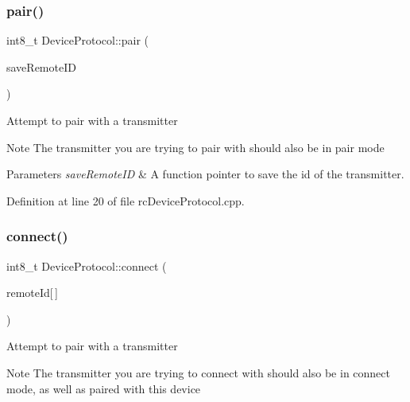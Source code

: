 \mbox{\label{classDeviceProtocol_aed6d598d72c46cfbc99cb9f8bcb301f7}} 
\subsubsection{\texorpdfstring{pair()}{pair()}}
{\footnotesize\ttfamily int8\+\_\+t Device\+Protocol\+::pair (\begin{DoxyParamCaption}\item[{\hyperlink{classDeviceProtocol_a1d33bbf35f5c6e7bb888eb06fc50c070}{Device\+Protocol\+::save\+Remote\+ID}}]{save\+Remote\+ID }\end{DoxyParamCaption})}

Attempt to pair with a transmitter

\begin{DoxyNote}{Note}
The transmitter you are trying to pair with should also be in pair mode
\end{DoxyNote}

\begin{DoxyParams}{Parameters}
{\em save\+Remote\+ID} & A function pointer to save the id of the transmitter. \\
\hline
\end{DoxyParams}


Definition at line 20 of file rc\+Device\+Protocol.\+cpp.

\mbox{\label{classDeviceProtocol_a099b7b72a19262ab5ff19a41c9ce0a9e}} 
\subsubsection{\texorpdfstring{connect()}{connect()}}
{\footnotesize\ttfamily int8\+\_\+t Device\+Protocol\+::connect (\begin{DoxyParamCaption}\item[{uint8\+\_\+t}]{remote\+Id\mbox{[}$\,$\mbox{]} }\end{DoxyParamCaption})}

Attempt to pair with a transmitter

\begin{DoxyNote}{Note}
The transmitter you are trying to connect with should also be in connect mode, as well as paired with this device
\end{DoxyNote}

